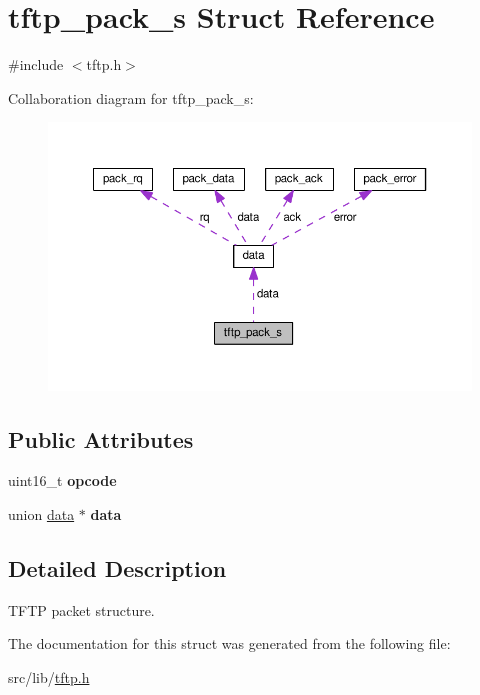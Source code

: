 \hypertarget{structtftp__pack__s}{}\section{tftp\+\_\+pack\+\_\+s Struct Reference}
\label{structtftp__pack__s}


{\ttfamily \#include $<$tftp.\+h$>$}



Collaboration diagram for tftp\+\_\+pack\+\_\+s\+:\nopagebreak
\begin{figure}[H]
\begin{center}
\leavevmode
\includegraphics[width=350pt]{structtftp__pack__s__coll__graph}
\end{center}
\end{figure}
\subsection*{Public Attributes}
\begin{DoxyCompactItemize}
\item 
uint16\+\_\+t {\bfseries opcode}\hypertarget{structtftp__pack__s_a20c790cca5e1780bd0b37076f5be37ce}{}\label{structtftp__pack__s_a20c790cca5e1780bd0b37076f5be37ce}

\item 
union \hyperlink{uniondata}{data} $\ast$ {\bfseries data}\hypertarget{structtftp__pack__s_a4c5e82ec1216b1b1c258fd34688f66ae}{}\label{structtftp__pack__s_a4c5e82ec1216b1b1c258fd34688f66ae}

\end{DoxyCompactItemize}


\subsection{Detailed Description}
T\+F\+TP packet structure. 

The documentation for this struct was generated from the following file\+:\begin{DoxyCompactItemize}
\item 
src/lib/\hyperlink{tftp_8h}{tftp.\+h}\end{DoxyCompactItemize}
